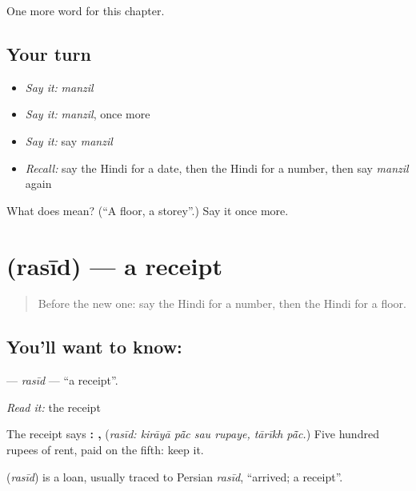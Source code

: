 \begin{grammarlens}[title={What you've built}]
One more word for this chapter.
\end{grammarlens}

\subsection*{Your turn}
\begin{itemize}
\raggedright
  \item \emph{Say it:} \emph{manzil}
  \item \emph{Say it:} \emph{manzil}, once more
  \item \emph{Say it:} say \emph{manzil}
  \item \emph{Recall:} say the Hindi for a date, then the Hindi for a number, then say \emph{manzil} again
\end{itemize}

\begin{tcolorbox}[breakable,colback=teal!4,colframe=teal!35!black,title={Before you move on}]
What does  mean? (\textquotedblleft{}A floor, a storey\textquotedblright{}.) Say it once more.
\end{tcolorbox}
\section[\texorpdfstring{\hi{रसीद} (rasīd)}{रसीद (rasīd)}]{ (rasīd) — a receipt}

\label{lesson:HI-C167-rasid}



\begin{quote}
Before the new one: say the Hindi for a number, then the Hindi for a floor.
\end{quote}

\subsection*{You'll want to know: }
\textbf{} — \emph{rasīd} — \textquotedblleft{}a receipt\textquotedblright{}.

\emph{Read it:} the receipt

The receipt says \textbf{:    ,  } (\emph{rasīd: kirāyā pā̃c sau rupaye, tārīkh pā̃c.}) Five hundred rupees of rent, paid on the fifth: keep it.

\begin{cousinweb}
\textbf{} (\emph{rasīd}) is a loan, usually traced to Persian \emph{rasīd}, \textquotedblleft{}arrived; a receipt\textquotedblright{}.
\end{cousinweb}

